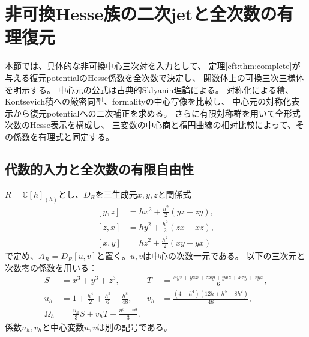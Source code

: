 \section{非可換Hesse族の二次jetと全次数の有理復元}
\label{gre:sec:example}

本節では、具体的な非可換中心三次対を入力として、
定理\ref{cft:thm:complete}が与える復元potentialのHesse係数を全次数で決定し、
関数体上の可換三次三様体を明示する。
中心元の公式は古典的Sklyanin理論による。
対称化による積、Kontsevich積への厳密同型、formalityの中心写像を比較し、
中心元の対称化表示から復元potentialへの二次補正を求める。
さらに有限対称群を用いて全形式次数のHesse表示を構成し、
三変数の中心商と楕円曲線の相対比較によって、その係数を有理式と同定する。

\subsection{代数的入力と全次数の有限自由性}
$R=\mathbb C[h]_{(h)}$とし、$D_R$を三生成元$x,y,z$と関係式
\begin{equation}\label{gre:eq:relations}
 \begin{aligned}
 [y,z]&=h x^2+\frac{h^2}{2}(yz+zy),\\
 [z,x]&=h y^2+\frac{h^2}{2}(zx+xz),\\
 [x,y]&=h z^2+\frac{h^2}{2}(xy+yx)
 \end{aligned}
\end{equation}
で定め、$A_R=D_R[u,v]$と置く。$u,v$は中心の次数一元である。
以下の三次元と次数零の係数を用いる：
\begin{equation}\label{gre:eq:central-coefficients}
 \begin{aligned}
 S&=x^3+y^3+z^3,&
 T&=\frac{xyz+yzx+zxy+yxz+xzy+zyx}{6},\\
 u_h&=1+\frac{h^4}{2}+\frac{h^5}{6}-\frac{h^8}{48},&
 v_h&=\frac{(4-h^4)(12h+h^5-8h^2)}{48},\\
 \Omega_h&=\frac{u_h}{3}S+v_hT+\frac{u^3+v^3}{3}.&&
 \end{aligned}
\end{equation}
係数$u_h,v_h$と中心変数$u,v$は別の記号である。

